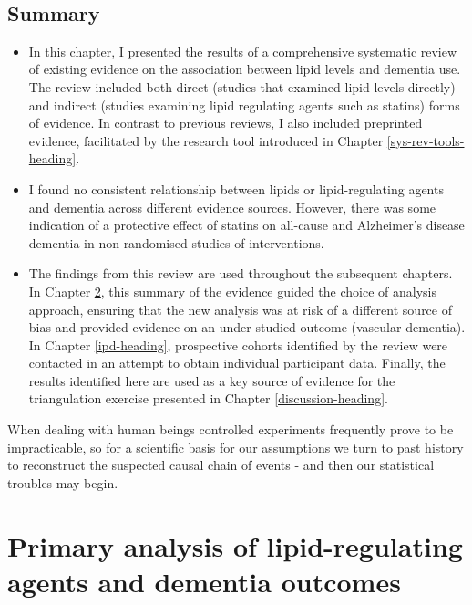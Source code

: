 \documentclass[a4paper, twoside]{templates/ociamthesis}
\begin{document}
~

\hypertarget{summary-3}{%
\section{Summary}\label{summary-3}}

\begin{itemize}
\item
  In this chapter, I presented the results of a comprehensive systematic review of existing evidence on the association between lipid levels and dementia use. The review included both direct (studies that examined lipid levels directly) and indirect (studies examining lipid regulating agents such as statins) forms of evidence. In contrast to previous reviews, I also included preprinted evidence, facilitated by the research tool introduced in Chapter \ref{sys-rev-tools-heading}.
\item
  I found no consistent relationship between lipids or lipid-regulating agents and dementia across different evidence sources. However, there was some indication of a protective effect of statins on all-cause and Alzheimer's disease dementia in non-randomised studies of interventions.
\item
  The findings from this review are used throughout the subsequent chapters. In Chapter \ref{cprd-analysis-heading}, this summary of the evidence guided the choice of analysis approach, ensuring that the new analysis was at risk of a different source of bias and provided evidence on an under-studied outcome (vascular dementia). In Chapter \ref{ipd-heading}, prospective cohorts identified by the review were contacted in an attempt to obtain individual participant data. Finally, the results identified here are used as a key source of evidence for the triangulation exercise presented in Chapter \ref{discussion-heading}.
\end{itemize}

\newpage

\begin{savequote}
When dealing with human beings controlled experiments frequently prove
to be impracticable, so for a scientific basis for our assumptions we
turn to past history to reconstruct the suspected causal chain of events
- and then our statistical troubles may begin.
\end{savequote}



\hypertarget{cprd-analysis-heading}{%
\chapter{Primary analysis of lipid-regulating agents and dementia outcomes}\label{cprd-analysis-heading}}
\end{document}
